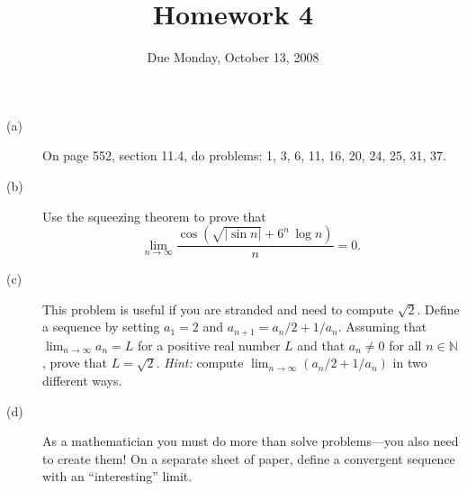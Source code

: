 \documentclass[12pt]{article}
\title{Homework 4}
\date{Due Monday, October 13, 2008}
\newcommand{\N}{\mathbb{N}}
\begin{document}
\maketitle


\begin{description}

\item[(a)] On page 552, section 11.4, do problems: 1, 3, 6, 11, 16,
  20, 24, 25, 31, 37.

\vfill

\item[(b)] Use the squeezing theorem to prove that
$$
\lim_{n \to \infty} \frac{\cos \left( \sqrt{\left| \sin n \right|} + 6^n \, \log n\right)}{n} = 0.
$$

\vfill

\item[(c)] This problem is useful if you are stranded and need to
  compute $\sqrt{2}$.  Define a sequence by setting $a_1 = 2$ and
  $a_{n+1} = a_n/2 + 1/a_n$.  Assuming that $\displaystyle\lim_{n \to
    \infty} a_n = L$ for a positive real number $L$ and that $a_n \neq
  0$ for all $n \in \N$, prove that $L = \sqrt{2}$.  \textit{Hint:}
  compute $\displaystyle\lim_{n \to \infty} \left( a_n/2 + 1/a_n
  \right)$ in two different ways.

\vfill

\item[(d)] As a mathematician you must do more than solve
  problems---you also need to create them!  On a separate sheet of
  paper, define a convergent sequence with an ``interesting'' limit.

\vfill

\end{description}
\end{document}
